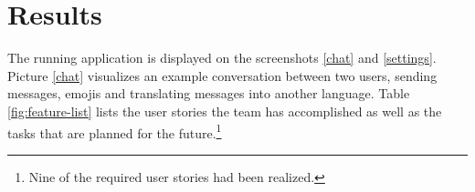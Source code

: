 \section{Results} 

The running application is displayed on the screenshots \ref{chat} and \ref{settings}.
Picture \ref{chat} visualizes an example conversation between two users, sending messages, emojis and translating messages into another language.
Table \ref{fig:feature-list} lists the user stories the team has accomplished as well as the tasks that are planned for the future.\footnote{Nine of the required user stories had been realized.}